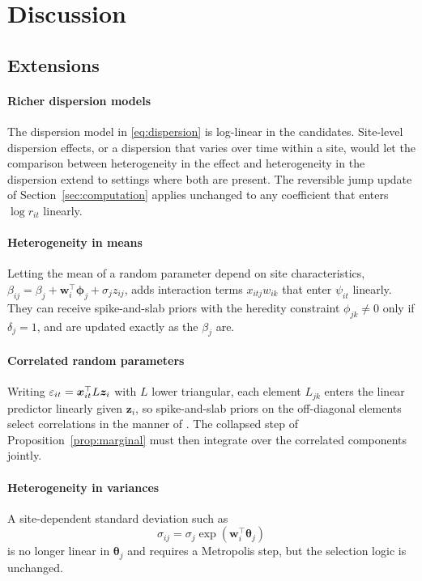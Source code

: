 \section{Discussion}\label{sec:discussion}

\subsection{Extensions}

\paragraph{Richer dispersion models} The dispersion model in \eqref{eq:dispersion} is log-linear in the candidates. Site-level dispersion effects, or a dispersion that varies over time within a site, would let the comparison between heterogeneity in the effect and heterogeneity in the dispersion extend to settings where both are present. The reversible jump update of Section~\ref{sec:computation} applies unchanged to any coefficient that enters $\log r_{it}$ linearly.

\paragraph{Heterogeneity in means} Letting the mean of a random parameter depend on site characteristics, $\beta_{ij}=\beta_j+\bm w_i^\top\bm\phi_j+\sigma_j z_{ij}$, adds interaction terms $x_{itj}w_{ik}$ that enter $\psi_{it}$ linearly. They can receive spike-and-slab priors with the heredity constraint $\phi_{jk}\neq0$ only if $\delta_j=1$, and are updated exactly as the $\beta_j$ are.

\paragraph{Correlated random parameters} Writing $\varepsilon_{it}=\bm{x}_{it}^\top L\bm z_i$ with $L$ lower triangular, each element $L_{jk}$ enters the linear predictor linearly given $\bm z_i$, so spike-and-slab priors on the off-diagonal elements select correlations in the manner of \citet{fruhwirth2008bayesian}. The collapsed step of Proposition~\ref{prop:marginal} must then integrate over the correlated components jointly. 

\paragraph{Heterogeneity in variances} A site-dependent standard deviation such as
\[
\sigma_{ij}=\sigma_j\exp(\bm w_i^\top\bm\theta_j)
\]
is no longer linear in $\bm\theta_j$ and requires a Metropolis step, but the selection logic is unchanged.

